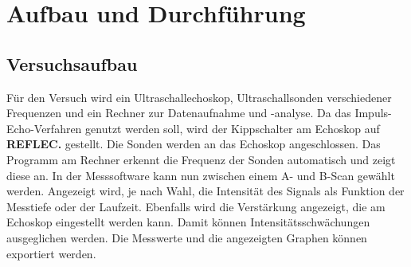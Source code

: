 \section{Aufbau und Durchführung}
\label{sec:Durchführung}
\subsection{Versuchsaufbau}
Für den Versuch wird ein Ultraschallechoskop, Ultraschallsonden verschiedener Frequenzen und ein Rechner zur Datenaufnahme und -analyse.
Da das Impuls-Echo-Verfahren genutzt werden soll, wird der Kippschalter am Echoskop auf \textbf{REFLEC.} gestellt. Die Sonden werden an das Echoskop angeschlossen.
Das Programm am Rechner erkennt die Frequenz der Sonden automatisch und zeigt diese an. In der Messsoftware kann nun zwischen einem A- und B-Scan gewählt werden.
Angezeigt wird, je nach Wahl, die Intensität des Signals als Funktion der Messtiefe oder der Laufzeit. Ebenfalls wird die Verstärkung angezeigt, die am Echoskop eingestellt werden kann.
Damit können Intensitätsschwächungen ausgeglichen werden.
Die Messwerte und die angezeigten Graphen können exportiert werden.

